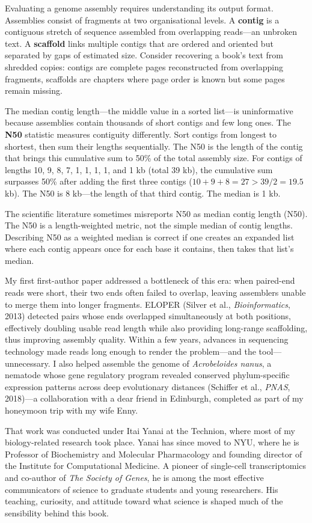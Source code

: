 \begin{commentary}
Evaluating a genome assembly requires understanding its output format. Assemblies consist of fragments at two organisational levels. A \textbf{contig} is a contiguous stretch of sequence assembled from overlapping reads—an unbroken text. A \textbf{scaffold} links multiple contigs that are ordered and oriented but separated by gaps of estimated size. Consider recovering a book's text from shredded copies: contigs are complete pages reconstructed from overlapping fragments, scaffolds are chapters where page order is known but some pages remain missing.

The median contig length—the middle value in a sorted list—is uninformative because assemblies contain thousands of short contigs and few long ones. The \textbf{N50} statistic measures contiguity differently. Sort contigs from longest to shortest, then sum their lengths sequentially. The N50 is the length of the contig that brings this cumulative sum to 50\% of the total assembly size. For contigs of lengths 10, 9, 8, 7, 1, 1, 1, 1, and 1 kb (total 39 kb), the cumulative sum surpasses 50\% after adding the first three contigs ($10+9+8=27>39/2=19.5$ kb). The N50 is 8 kb—the length of that third contig. The median is 1 kb.

The scientific literature sometimes misreports N50 as \QSOpen{}median contig length (N50).\QSClose{} The N50 is a length-weighted metric, not the simple median of contig lengths. Describing N50 as a \QSOpen{}weighted median\QSClose{} is correct if one creates an expanded list where each contig appears once for each base it contains, then takes that list's median.

My first first-author paper addressed a bottleneck of this era: when paired-end reads were short, their two ends often failed to overlap, leaving assemblers unable to merge them into longer fragments. ELOPER (Silver et al., \textit{Bioinformatics}, 2013) detected pairs whose ends overlapped simultaneously at both positions, effectively doubling usable read length while also providing long-range scaffolding, thus improving assembly quality. Within a few years, advances in sequencing technology made reads long enough to render the problem—and the tool—unnecessary. I also helped assemble the genome of \textit{Acrobeloides nanus}, a nematode whose gene regulatory program revealed conserved phylum-specific expression patterns across deep evolutionary distances (Schiffer et al., \textit{PNAS}, 2018)—a collaboration with a dear friend in Edinburgh, completed as part of my honeymoon trip with my wife Enny.

That work was conducted under Itai Yanai at the Technion, where most of my biology-related research took place. Yanai has since moved to NYU, where he is Professor of Biochemistry and Molecular Pharmacology and founding director of the Institute for Computational Medicine. A pioneer of single-cell transcriptomics and co-author of \textit{The Society of Genes}, he is among the most effective communicators of science to graduate students and young researchers. His teaching, curiosity, and attitude toward what science is shaped much of the sensibility behind this book.
\end{commentary}

